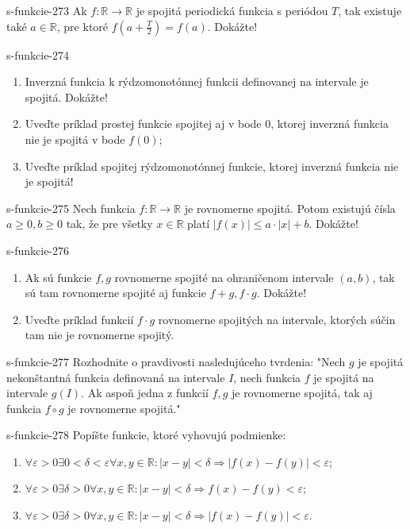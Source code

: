 \begin{defproblem}{s-funkcie-273}
Ak $f: \mathbb{R} \rightarrow \mathbb{R}$ je spojitá periodická funkcia s periódou $T$, tak existuje také $a \in \mathbb{R}$, pre ktoré $f(a+\frac{T}{2})=f(a)$. Dokážte!
\end{defproblem}

\begin{defproblem}{s-funkcie-274}
  \begin{enumerate}
    \item
      Inverzná funkcia k rýdzomonotónnej funkcii definovanej na intervale je
      spojitá. Dokážte!
    \item
      Uveďte príklad prostej funkcie spojitej aj v bode $0$, ktorej inverzná
      funkcia nie je spojitá v bode $f(0)$;
    \item
      Uveďte príklad spojitej rýdzomonotónnej funkcie, ktorej inverzná funkcia
      nie je spojitá!
  \end{enumerate}
\end{defproblem}

\begin{defproblem}{s-funkcie-275}
Nech funkcia $f: \mathbb{R} \rightarrow \mathbb{R}$ je rovnomerne spojitá. Potom existujú čísla $a \geq 0,b \geq 0$ tak, že pre všetky $x \in \mathbb{R}$ platí $|f(x)| \leq a \cdot |x|+b$. Dokážte!
\end{defproblem}

\begin{defproblem}{s-funkcie-276}
\begin{enumerate}
\item Ak sú funkcie $f,g$ rovnomerne spojité na ohraničenom intervale $(a,b)$, tak sú tam rovnomerne spojité aj funkcie $f+g,f \cdot g$. Dokážte!
\item Uveďte príklad funkcií $f \cdot g$ rovnomerne spojitých na intervale, ktorých súčin tam nie je rovnomerne spojitý.
\end{enumerate}
\end{defproblem}

\begin{defproblem}{s-funkcie-277}
Rozhodnite o pravdivosti nasledujúceho tvrdenia: "Nech $g$ je spojitá nekonštantná funkcia definovaná na intervale $I$, nech funkcia $f$ je spojitá na intervale $g(I)$. Ak aspoň jedna z funkcií $f,g$ je rovnomerne spojitá, tak aj funkcia $f \circ g$ je rovnomerne spojitá."
\end{defproblem}

\begin{defproblem}{s-funkcie-278}
Popíšte funkcie, ktoré vyhovujú podmienke:
\begin{enumerate}
\item $\forall \varepsilon >0 \exists 0<\delta<\varepsilon \forall x,y \in \mathbb{R}:|x-y|<\delta \Rightarrow |f(x)-f(y)|<\varepsilon$;
\item $\forall \varepsilon >0 \exists \delta>0 \forall x,y \in \mathbb{R}:|x-y|<\delta \Rightarrow f(x)-f(y)<\varepsilon$;
\item $\forall \varepsilon >0 \exists \delta>0 \forall x,y \in \mathbb{R}:|x-y|<\delta \Rightarrow |f(x)-f(y)|<\varepsilon$.
\end{enumerate}
\end{defproblem}
